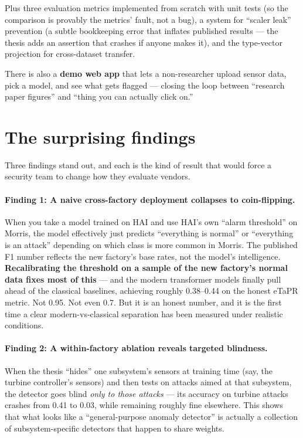 \documentclass[11pt,a4paper]{article}
\begin{document}
Plus three evaluation metrics implemented from scratch with unit tests (so the comparison is provably the metrics' fault, not a bug), a system for ``scaler leak'' prevention (a subtle bookkeeping error that inflates published results --- the thesis adds an assertion that crashes if anyone makes it), and the type-vector projection for cross-dataset transfer.

There is also a \textbf{demo web app} that lets a non-researcher upload sensor data, pick a model, and see what gets flagged --- closing the loop between ``research paper figures'' and ``thing you can actually click on.''

\section{The surprising findings}

Three findings stand out, and each is the kind of result that would force a security team to change how they evaluate vendors.

\paragraph{Finding 1: A naive cross-factory deployment collapses to coin-flipping.}
When you take a model trained on HAI and use HAI's own ``alarm threshold'' on Morris, the model effectively just predicts ``everything is normal'' or ``everything is an attack'' depending on which class is more common in Morris. The published F1 number reflects the new factory's base rates, not the model's intelligence. \textbf{Recalibrating the threshold on a sample of the new factory's normal data fixes most of this} --- and the modern transformer models finally pull ahead of the classical baselines, achieving roughly 0.38--0.44 on the honest eTaPR metric. Not 0.95. Not even 0.7. But it is an honest number, and it is the first time a clear modern-vs-classical separation has been measured under realistic conditions.

\paragraph{Finding 2: A within-factory ablation reveals targeted blindness.}
When the thesis ``hides'' one subsystem's sensors at training time (say, the turbine controller's sensors) and then tests on attacks aimed at that subsystem, the detector goes blind \emph{only to those attacks} --- its accuracy on turbine attacks crashes from 0.41 to 0.03, while remaining roughly fine elsewhere. This shows that what looks like a ``general-purpose anomaly detector'' is actually a collection of subsystem-specific detectors that happen to share weights.
\end{document}
